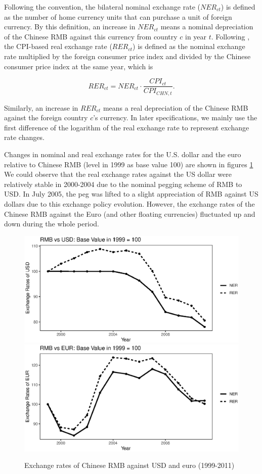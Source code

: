 Following the convention, the bilateral nominal exchange rate ($NER_{ct}$) is defined as the number of home currency units that can purchase a unit of foreign currency. By this definition, an increase in $NER_{ct}$ means a nominal depreciation of the Chinese RMB against this currency from country $c$ in year $t$. Following \cite{lmx2015}, the CPI-based real exchange rate ($RER_{ct}$) is defined as the nominal exchange rate multiplied by the foreign consumer price index and divided by the Chinese consumer price index at the same year, which is

$$
RER_{ct}=NER_{ct} \cdot \frac{CPI_{ct}}{CPI_{CHN,t}}.
$$

Similarly, an increase in $RER_{ct}$ means a real depreciation of the Chinese RMB against the foreign country $c$'s currency. In later specifications, we mainly use the first difference of the logarithm of the real exchange rate to represent exchange rate changes.

Changes in nominal and real exchange rates for the U.S. dollar and the euro relative to Chinese RMB (level in 1999 as base value 100) are shown in figures \ref{fig.ER} We could observe that the real exchange rates against the US dollar were relatively stable in 2000-2004 due to the nominal pegging scheme of RMB to USD. In July 2005, the peg was lifted to a slight appreciation of RMB against US dollars due to this exchange policy evolution. However, the exchange rates of the Chinese RMB against the Euro (and other floating currencies) fluctuated up and down during the whole period. 

\begin{figure}[htbp]
	\centering
	\includegraphics[width=1\textwidth]{R/USD.eps}
	\includegraphics[width=1\textwidth]{R/EUR.eps}
	\caption{Exchange rates of Chinese RMB against USD and euro (1999-2011)}
	\label{fig.ER}
\end{figure}

